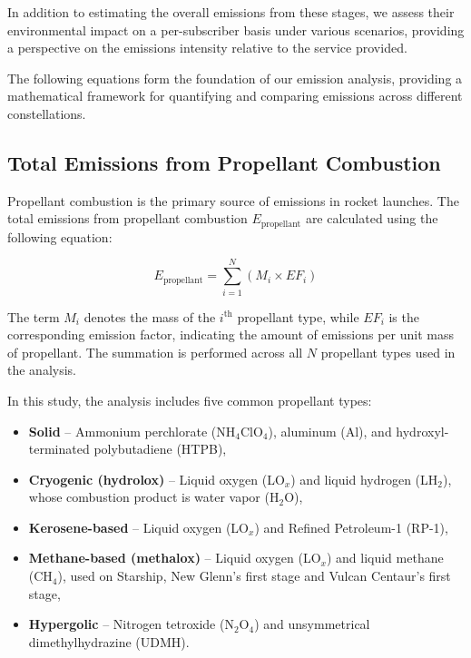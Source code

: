 \documentclass[pdflatex,sn-mathphys-num]{sn-jnl}
\theoremstyle{thmstyleone}%
\theoremstyle{thmstyletwo}%
\theoremstyle{thmstylethree}%
\begin{document}
In addition to estimating the overall emissions from these stages, we assess their environmental impact on a per-subscriber basis under various scenarios, providing a perspective on the emissions intensity relative to the service provided.

The following equations form the foundation of our emission analysis, providing a mathematical framework for quantifying and comparing emissions across different constellations.

\subsection{Total Emissions from Propellant Combustion}\label{sec:propellant}

Propellant combustion is the primary source of emissions in rocket launches. The total emissions from propellant combustion \( E_{\text{propellant}} \) are calculated using the following equation:

\begin{equation}
E_{\text{propellant}} = \sum_{i=1}^{N} \left( M_{i} \times EF_{i} \right)
\end{equation}

The term \( M_{i} \) denotes the mass of the \( i^{\text{th}} \) propellant type, while \( EF_{i} \) is the corresponding emission factor, indicating the amount of emissions per unit mass of propellant. The summation is performed across all \( N \) propellant types used in the analysis.

In this study, the analysis includes five common propellant types:
\begin{itemize}
    \item \textbf{Solid} – Ammonium perchlorate (NH\(_4\)ClO\(_4\)), aluminum (Al), and hydroxyl-terminated polybutadiene (HTPB),
    \item \textbf{Cryogenic (hydrolox)} – Liquid oxygen (LO\(_x\)) and liquid hydrogen (LH\(_2\)), whose combustion product is water vapor (H\(_2\)O),
    \item \textbf{Kerosene-based} – Liquid oxygen (LO\(_x\)) and Refined Petroleum-1 (RP-1),
    \item \textbf{Methane-based (methalox)} – Liquid oxygen (LO\(_x\)) and liquid methane (CH\(_4\)), used on Starship, New Glenn's first stage and Vulcan Centaur's first stage,
    \item \textbf{Hypergolic} – Nitrogen tetroxide (N\(_2\)O\(_4\)) and unsymmetrical dimethylhydrazine (UDMH).
\end{itemize}
\end{document}
